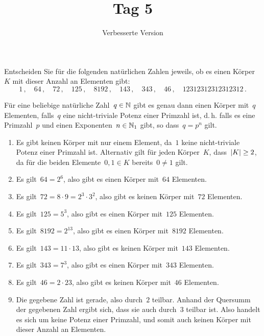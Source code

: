 \documentclass{scrartcl}
\title{\vspace{-1em}Tag 5}
\subtitle{Verbesserte Version}
\author{}
\date{}
\begin{document}
\maketitle
\vspace{-7em}

\begin{exercise}[subtitle = {Erstklausur~18/19, Zweitklausur~18/19}]
  Entscheiden Sie für die folgenden natürlichen Zahlen jeweils, ob es einen Körper~$K$ mit dieser Anzahl an Elementen gibt:
  \[
    1 \,,
    \quad
    64 \,,
    \quad
    72 \,,
    \quad
    125 \,,
    \quad
    8192 \,,
    \quad
    143 \,,
    \quad
    343 \,,
    \quad
    46 \,,
    \quad
    12312312312312312 \,.
  \]
\end{exercise}

\begin{solution}
  Für eine beliebige natürliche Zahl~$q \in \mathbb{N}$ gibt es genau dann einen Körper mit~$q$ Elementen, falls~$q$ eine nicht-triviale Potenz einer Primzahl ist, d.\,h. falls es eine Primzahl~$p$ und einen Exponenten~$n \in \mathbb{N}_1$ gibt, so dass~$q = p^n$ gilt.
  \begin{enumerate}
    \item
      Es gibt keinen Körper mit nur einem Element, da~$1$ keine nicht-triviale Potenz einer Primzahl ist.
      Alternativ gilt für jeden Körper~$K$, dass~$\lvert K\rvert \geq 2$, da für die beiden Elemente~$0, 1 \in K$ bereits~$0 \neq 1$ gilt.
    \item
      Es gilt~$64 = 2^6$, also gibt es einen Körper mit~$64$ Elementen.
    \item
      Es gilt~$72 = 8 \cdot 9 = 2^3 \cdot 3^2$, also gibt es keinen Körper mit~$72$ Elementen.
    \item
      Es gilt~$125 = 5^3$, also gibt es einen Körper mit~$125$ Elementen.
    \item
      Es gilt~$8192 = 2^{13}$, also gibt es einen Körper mit~$8192$ Elementen.
    \item
      Es gilt~$143 = 11 \cdot 13$, also gibt es keinen Körper mit~$143$ Elementen.
    \item
      Es gilt~$343 = 7^3$, also gibt es einen Körper mit~$343$ Elementen.
    \item
      Es gilt~$46 = 2 \cdot 23$, also gibt es keinen Körper mit~$46$ Elementen.
    \item
      Die gegebene Zahl ist gerade, also durch~$2$ teilbar.
      Anhand der Quersumm der gegebenen Zahl ergibt sich, dass sie auch durch~$3$ teilbar ist.
      Also handelt es sich um keine Potenz einer Primzahl, und somit auch keinen Körper mit dieser Anzahl an Elementen.
  \end{enumerate}
\end{solution}
\end{document}
